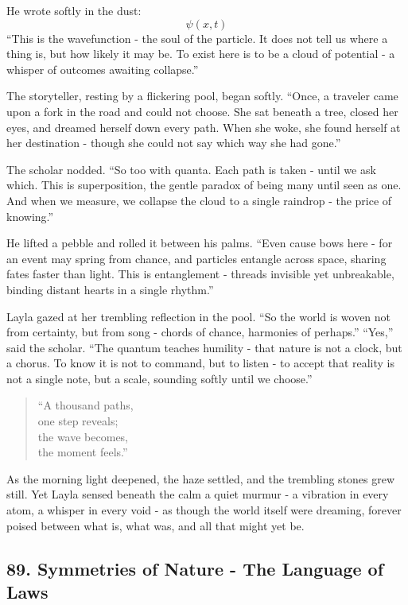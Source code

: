 \documentclass[
  letterpaper,
  DIV=11,
  numbers=noendperiod]{scrreprt}
\begin{document}
He wrote softly in the dust: \[
\psi(x,t)
\] ``This is the wavefunction - the soul of the particle. It does not
tell us where a thing is, but how likely it may be. To exist here is to
be a cloud of potential - a whisper of outcomes awaiting collapse.''

The storyteller, resting by a flickering pool, began softly. ``Once, a
traveler came upon a fork in the road and could not choose. She sat
beneath a tree, closed her eyes, and dreamed herself down every path.
When she woke, she found herself at her destination - though she could
not say which way she had gone.''

The scholar nodded. ``So too with quanta. Each path is taken - until we
ask which. This is superposition, the gentle paradox of being many until
seen as one. And when we measure, we collapse the cloud to a single
raindrop - the price of knowing.''

He lifted a pebble and rolled it between his palms. ``Even cause bows
here - for an event may spring from chance, and particles entangle
across space, sharing fates faster than light. This is entanglement -
threads invisible yet unbreakable, binding distant hearts in a single
rhythm.''

Layla gazed at her trembling reflection in the pool. ``So the world is
woven not from certainty, but from song - chords of chance, harmonies of
perhaps.'' ``Yes,'' said the scholar. ``The quantum teaches humility -
that nature is not a clock, but a chorus. To know it is not to command,
but to listen - to accept that reality is not a single note, but a
scale, sounding softly until we choose.''

\begin{quote}
``A thousand paths,\\
one step reveals;\\
the wave becomes,\\
the moment feels.''
\end{quote}

As the morning light deepened, the haze settled, and the trembling
stones grew still. Yet Layla sensed beneath the calm a quiet murmur - a
vibration in every atom, a whisper in every void - as though the world
itself were dreaming, forever poised between what is, what was, and all
that might yet be.

\subsection{89. Symmetries of Nature - The Language of
Laws}\label{symmetries-of-nature---the-language-of-laws}
\end{document}
